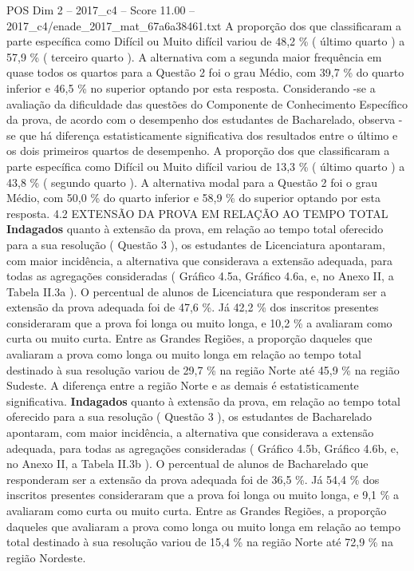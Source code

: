 \begin{textsample}{POS Dim 2 – 2017\_c4 – Score 11.00 – 2017\_c4/enade\_2017\_mat\_67a6a38461.txt}
A proporção dos que classificaram a parte específica como Difícil ou Muito difícil variou de 48,2 \% ( último quarto ) a 57,9 \% ( terceiro quarto ).
A alternativa com a segunda maior frequência em quase todos os quartos para a Questão 2 foi o grau Médio, com 39,7 \% do quarto inferior e 46,5 \% no superior optando por esta resposta.
Considerando -se a avaliação da dificuldade das questões do Componente de Conhecimento Específico da prova, de acordo com o desempenho dos estudantes de Bacharelado, observa -se que há diferença estatisticamente significativa dos resultados entre o último e os dois primeiros quartos de desempenho.
A proporção dos que classificaram a parte específica como Difícil ou Muito difícil variou de 13,3 \% ( último quarto ) a 43,8 \% ( segundo quarto ).
A alternativa modal para a Questão 2 foi o grau Médio, com 50,0 \% do quarto inferior e 58,9 \% do superior optando por esta resposta. 4.2 EXTENSÃO DA PROVA EM RELAÇÃO AO TEMPO TOTAL \textbf{Indagados} quanto à extensão da prova, em relação ao tempo total oferecido para a sua resolução ( Questão 3 ), os estudantes de Licenciatura apontaram, com maior incidência, a alternativa que considerava a extensão adequada, para todas as agregações consideradas ( Gráfico 4.5a, Gráfico 4.6a, e, no Anexo II, a Tabela II.3a ).
O percentual de alunos de Licenciatura que responderam ser a extensão da prova adequada foi de 47,6 \%.
Já 42,2 \% dos inscritos presentes consideraram que a prova foi longa ou muito longa, e 10,2 \% a avaliaram como curta ou muito curta.
Entre as Grandes Regiões, a proporção daqueles que avaliaram a prova como longa ou muito longa em relação ao tempo total destinado à sua resolução variou de 29,7 \% na região Norte até 45,9 \% na região Sudeste.
A diferença entre a região Norte e as demais é estatisticamente significativa. \textbf{Indagados} quanto à extensão da prova, em relação ao tempo total oferecido para a sua resolução ( Questão 3 ), os estudantes de Bacharelado apontaram, com maior incidência, a alternativa que considerava a extensão adequada, para todas as agregações consideradas ( Gráfico 4.5b, Gráfico 4.6b, e, no Anexo II, a Tabela II.3b ).
O percentual de alunos de Bacharelado que responderam ser a extensão da prova adequada foi de 36,5 \%.
Já 54,4 \% dos inscritos presentes consideraram que a prova foi longa ou muito longa, e 9,1 \% a avaliaram como curta ou muito curta.
Entre as Grandes Regiões, a proporção daqueles que avaliaram a prova como longa ou muito longa em relação ao tempo total destinado à sua resolução variou de 15,4 \% na região Norte até 72,9 \% na região Nordeste.

\end{textsample}
